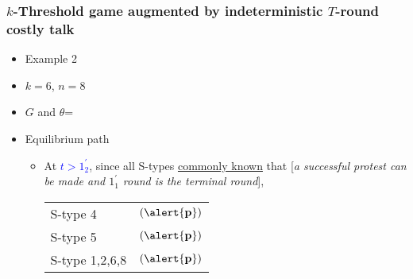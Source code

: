 \documentclass[9pt]{beamer}
\begin{document}
\begin{frame}
  \frametitle{$k$-Threshold game augmented by indeterministic $T$-round costly talk}

\begin{itemize}
\item Example 2
\item $k=6$, $n=8$
\item $G$ and $\theta$=
\begin{center}
\end{center}
\end{itemize}

\begin{itemize}
\item Equilibrium path
\begin{itemize}
\item 
{
At \textcolor{blue}{$t>1^{'}_2$}, since all S-types \underline{commonly known} that \alert{[}\textit{a successful protest can be made and $1^{'}_1$ round is the terminal round}\alert{]},  
\begin{table}[h]
\begin{tabular}{ll }
S-type 4 & $(\alert{\textbf{p}})$\\
S-type 5 & $(\alert{\textbf{p}})$\\
S-type 1,2,6,8 & $(\alert{\textbf{p}})$
\end{tabular}
\end{table}
}

\end{itemize}
\end{itemize}
\end{frame}
\end{document}
